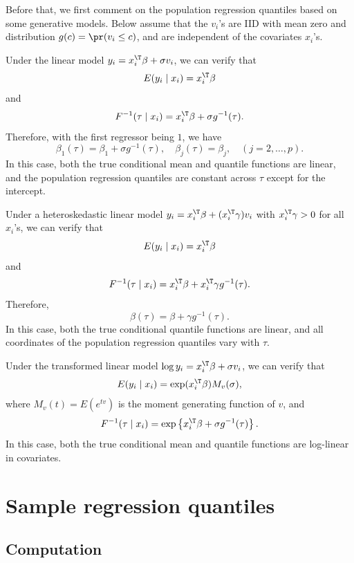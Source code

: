  
Before that, we first comment
on the population regression quantiles based on some generative models. Below assume that the $v_{i}$'s are IID with mean zero and distribution $g(c) = \pr(  v_i \leq c)$, and are independent of the covariates $x_i$'s. 



\begin{example}
Under the linear model $y_{i}=x_{i}^{\T}\beta+\sigma v_{i}$, we can verify that 
$$
E(y_i\mid x_i) = x_{i}^{\T}\beta
$$
and
\[
F^{-1}(\tau\mid x_{i})=x_{i}^{\T}\beta+\sigma g^{-1}(\tau).
\]
Therefore, with the first regressor being $1$, we have
\[
\beta_{1}(\tau)=\beta_{1}+\sigma g^{-1}(\tau),\quad\beta_{j}(\tau)=\beta_{j},\quad(j=2,\ldots,p).
\]
In this case, both the true conditional mean and quantile functions are linear, and
the population regression quantiles are constant across $\tau$ except
for the intercept.
\end{example}




\begin{example}
Under a heteroskedastic linear model $y_{i}=x_{i}^{\T}\beta+(x_{i}^{\T}\gamma)v_{i}$
with   $x_{i}^{\T}\gamma>0$ for all $x_{i}$'s,
we can verify that 
$$
E(y_i\mid x_i) = x_{i}^{\T}\beta
$$
and 
\[
F^{-1}(\tau\mid x_{i})=x_{i}^{\T}\beta+x_{i}^{\T}\gamma g^{-1}(\tau).
\]
Therefore, 
\[
\beta(\tau)=\beta+\gamma g^{-1}(\tau).
\]
In this case, both the true conditional quantile functions are linear, and
all coordinates of the population regression quantiles vary with $\tau$. 
\end{example}



\begin{example}
Under the transformed linear model $\log y_{i}=x_{i}^{\T}\beta+\sigma v_{i}$, we can verify that 
$$
E(y_i\mid x_i) = \exp(x_{i}^{\T}\beta) M_v(\sigma),
$$
where $M_v(t) = E(e^{tv})$ is the moment generating function of $v$, 
and 
\[
F^{-1}(\tau\mid x_{i})=\exp\left\{ x_{i}^{\T}\beta+\sigma g^{-1}(\tau)\right\} .
\]
In this case, both the true conditional mean and quantile functions are log-linear in covariates. 
\end{example}
   

\section{Sample regression quantiles}

\subsection{Computation}

